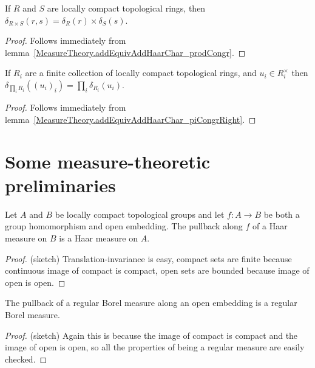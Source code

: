 \begin{lemma}
  \label{MeasureTheory.ringHaarChar_prod}
  \leanok
  If $R$ and $S$ are locally compact topological rings, then $\delta_{R\times S}(r,s)=\delta_R(r)\times\delta_S(s)$.
\end{lemma}
\begin{proof}
  \leanok
  Follows immediately from lemma~\ref{MeasureTheory.addEquivAddHaarChar_prodCongr}.
\end{proof}

\begin{lemma}
  \label{MeasureTheory.ringHaarChar_pi}
  \leanok
  If $R_i$ are a finite collection of locally compact topological rings,
  and $u_i\in R_i^\times$ then $\delta_{\prod_i R_i}((u_i)_i)=\prod_i\delta_{R_i}(u_i)$.
\end{lemma}
\begin{proof}
  \leanok
  Follows immediately from lemma~\ref{MeasureTheory.addEquivAddHaarChar_piCongrRight}.
\end{proof}

\section{Some measure-theoretic preliminaries}

\begin{lemma}
  \label{Topology.IsOpenEmbedding.isHaarMeasure_comap}
  \leanok
  Let $A$ and $B$ be locally compact topological groups
  and let $f:A\to B$ be both a group homomorphism and open embedding.
  The pullback along $f$ of a Haar measure on $B$ is a Haar measure on $A$.
\end{lemma}
\begin{proof}
  \leanok
  (sketch) Translation-invariance is easy, compact sets are finite because continuous
  image of compact is compact, open sets are bounded because image of open is open.
\end{proof}

\begin{lemma}
  \label{Topology.IsOpenEmbedding.regular_comap}
  \leanok
  The pullback of a regular Borel measure along an open
  embedding is a regular Borel measure.
\end{lemma}
\begin{proof}
  \leanok
  (sketch) Again this is because the image of compact is compact and the
  image of open is open, so all the properties of being a regular measure
  are easily checked.
\end{proof}

